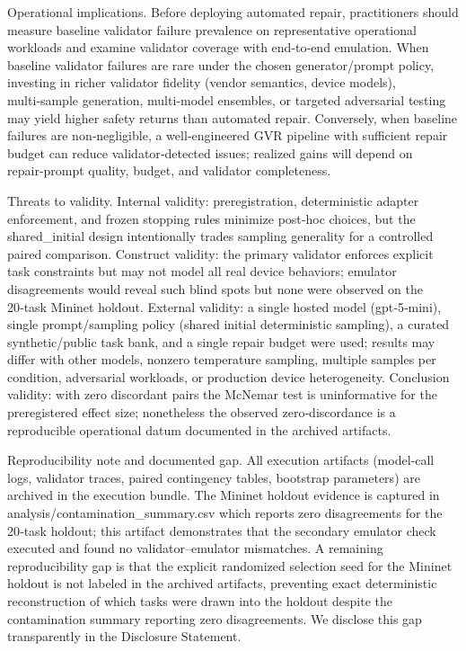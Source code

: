 \documentclass[conference]{IEEEtran}
\begin{document}
Operational implications. Before deploying automated repair, practitioners should measure baseline validator failure prevalence on representative operational workloads and examine validator coverage with end‑to‑end emulation. When baseline validator failures are rare under the chosen generator/prompt policy, investing in richer validator fidelity (vendor semantics, device models), multi‑sample generation, multi‑model ensembles, or targeted adversarial testing may yield higher safety returns than automated repair. Conversely, when baseline failures are non‑negligible, a well‑engineered GVR pipeline with sufficient repair budget can reduce validator‑detected issues; realized gains will depend on repair‑prompt quality, budget, and validator completeness.

Threats to validity. Internal validity: preregistration, deterministic adapter enforcement, and frozen stopping rules minimize post‑hoc choices, but the shared\_initial design intentionally trades sampling generality for a controlled paired comparison. Construct validity: the primary validator enforces explicit task constraints but may not model all real device behaviors; emulator disagreements would reveal such blind spots but none were observed on the 20‑task Mininet holdout. External validity: a single hosted model (gpt‑5‑mini), single prompt/sampling policy (shared initial deterministic sampling), a curated synthetic/public task bank, and a single repair budget were used; results may differ with other models, nonzero temperature sampling, multiple samples per condition, adversarial workloads, or production device heterogeneity. Conclusion validity: with zero discordant pairs the McNemar test is uninformative for the preregistered effect size; nonetheless the observed zero‑discordance is a reproducible operational datum documented in the archived artifacts.

Reproducibility note and documented gap. All execution artifacts (model‑call logs, validator traces, paired contingency tables, bootstrap parameters) are archived in the execution bundle. The Mininet holdout evidence is captured in analysis/contamination\_summary.csv which reports zero disagreements for the 20‑task holdout; this artifact demonstrates that the secondary emulator check executed and found no validator--emulator mismatches. A remaining reproducibility gap is that the explicit randomized selection seed for the Mininet holdout is not labeled in the archived artifacts, preventing exact deterministic reconstruction of which tasks were drawn into the holdout despite the contamination summary reporting zero disagreements. We disclose this gap transparently in the Disclosure Statement.
\end{document}
